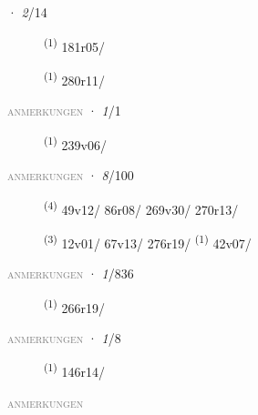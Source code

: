 \ENTRYEND
\noindent{} · \textit{2}/14 \LEMMALINE
\begin{description}
    \item[]  \textsuperscript{(1)} \mbox{181r05/}
    \item[]  \textsuperscript{(1)} \mbox{280r11/}
\end{description}
\textsc{\textcolor{gray}{anmerkungen}}
\ENTRYEND
\noindent{} · \textit{1}/1 \LEMMALINE
\begin{description}
    \item[]  \textsuperscript{(1)} \mbox{239v06/}
\end{description}
\textsc{\textcolor{gray}{anmerkungen}}
\ENTRYEND
\noindent{} · \textit{8}/100 \LEMMALINE
\begin{description}
    \item[]  \textsuperscript{(4)} \mbox{49v12/} \mbox{86r08/} \mbox{269v30/} \mbox{270r13/}
    \item[]  \textsuperscript{(3)} \mbox{12v01/} \mbox{67v13/} \mbox{276r19/} \textsuperscript{(1)} \mbox{42v07/}
\end{description}
\textsc{\textcolor{gray}{anmerkungen}}
\ENTRYEND
\noindent{} · \textit{1}/836 \LEMMALINE
\begin{description}
    \item[]  \textsuperscript{(1)} \mbox{266r19/}
\end{description}
\textsc{\textcolor{gray}{anmerkungen}}
\ENTRYEND
\noindent{} · \textit{1}/8 \LEMMALINE
\begin{description}
    \item[]  \textsuperscript{(1)} \mbox{146r14/}
\end{description}
\textsc{\textcolor{gray}{anmerkungen}}
\ENTRYEND
